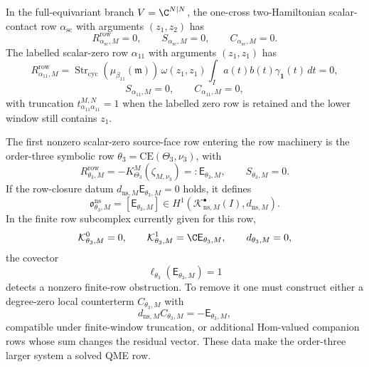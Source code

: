 \begin{prop}
\label{prop:app-closed-rows-and-theta-three-source-face}
  In the full-equivariant branch \(V=\C^{N|N}\), the one-cross
  two-Hamiltonian scalar-contact row
  \(\alpha_{\mathrm{sc}}\) with arguments \((z_1,z_2)\) has
  \[
    R^{\mathrm{row}}_{\alpha_{\mathrm{sc}},M}=0,
    \qquad
    S_{\alpha_{\mathrm{sc}},M}=0,
    \qquad
    C_{\alpha_{\mathrm{sc}},M}=0 .
  \]
  The labelled scalar-zero row \(\alpha_{11}\) with arguments
  \((z_1,z_1)\) has
  \[
    R^{\mathrm{row}}_{\alpha_{11},M}
      =
    \operatorname{Str}_{\mathrm{cyc}}
      (\mu_{\beta_{11}}(\mathfrak m))\,
    \omega(z_1,z_1)
    \int_Ia(t)b(t)\gamma_{\mathbf 1}(t)\,dt
      =0,
  \]
  \[
    S_{\alpha_{11},M}=0,\qquad C_{\alpha_{11},M}=0,
  \]
  with truncation \(t^{M,N}_{\alpha_{11}\alpha_{11}}=1\) when the labelled
  zero row is retained and the lower window still contains \(z_1\).

  The first nonzero scalar-zero source-face row entering the row
  machinery is the order-three symbolic row
  \(\theta_3=\mathrm{CE}(\Theta_3,\nu_3)\), with
  \[
    R^{\mathrm{row}}_{\theta_3,M}
      =
    -K^M_{\Theta_3}(\zeta_{M,\nu_3})
      =:\mathsf E_{\theta_3,M},
    \qquad
    S_{\theta_3,M}=0 .
  \]
  If the row-closure datum
  \(d_{\mathrm{ns},M}\mathsf E_{\theta_3,M}=0\) holds, it defines
  \[
    \mathfrak o^{\mathrm{ns}}_{\theta_3,M}
      =
    [\mathsf E_{\theta_3,M}]
    \in
    H^1(\mathcal K^\bullet_{\mathrm{ns},M}(I),d_{\mathrm{ns},M}).
  \]
  In the finite row subcomplex currently given for this row,
  \[
    \mathcal K^0_{\theta_3,M}=0,\qquad
    \mathcal K^1_{\theta_3,M}=\C\mathsf E_{\theta_3,M},\qquad
    d_{\theta_3,M}=0,
  \]
  the covector
  \[
    \ell_{\theta_3}(\mathsf E_{\theta_3,M})=1
  \]
  detects a nonzero finite-row obstruction.  To remove it one must construct
  either a degree-zero local counterterm
  \(C_{\theta_3,M}\) with
  \[
    d_{\mathrm{ns},M}C_{\theta_3,M}
      =-\mathsf E_{\theta_3,M},
  \]
  compatible under finite-window truncation, or additional Hom-valued
  companion rows whose sum changes the residual vector.  These data make
  the order-three larger system a solved QME row.
\end{prop}

